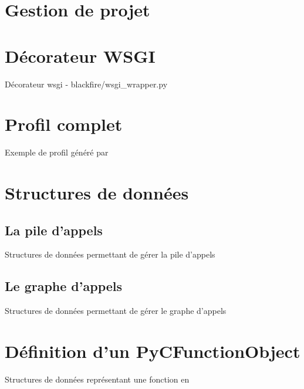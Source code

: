 \chapter{Gestion de projet}



\chapter{Décorateur WSGI}
  \label{app:decorateurwsgi}
  \begin{listing}[H]
    \caption{Décorateur wsgi - blackfire/wsgi\_wrapper.py}
  \end{listing}
 
\chapter{Profil complet}
  \label{app:fullProfile}
  \begin{listing}[H]
    \caption{Exemple de profil généré par \Blackfire}
  \end{listing}
 
\chapter{Structures de données}
  \section{La pile d'appels}
    \label{app:pile_struct}
    \begin{listing}[H]
      \caption{Structures de données permettant de gérer la pile d'appels}
    \end{listing}
  \section{Le graphe d'appels}
    \label{app:graph_struct}
    \begin{listing}[H]
      \caption{Structures de données permettant de gérer le graphe d'appels}
    \end{listing}
 
\chapter{Définition d'un PyCFunctionObject}
  \label{app:PyCFunctionObject}
  \begin{listing}[H]
    \caption{Structures de données représentant une fonction \C en \Python}
  \end{listing}
 

